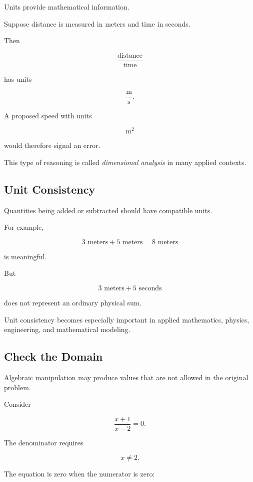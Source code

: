 Units provide mathematical information.

Suppose distance is measured in meters and time in seconds.

Then

\[ \frac{\text{distance}}{\text{time}} \]

has units

\[ \frac{\mathrm m}{\mathrm s}. \]

A proposed speed with units

\[ \mathrm m^2 \]

would therefore signal an error.

This type of reasoning is called \emph{dimensional analysis} in many applied
contexts.

\subsection{Unit Consistency}
\label{subsec:unit-consistency}

Quantities being added or subtracted should have compatible units.

For example,

\[ 3\text{ meters}+5\text{ meters}=8\text{ meters} \]

is meaningful.

But

\[ 3\text{ meters}+5\text{ seconds} \]

does not represent an ordinary physical sum.

Unit consistency becomes especially important in applied mathematics,
physics, engineering, and mathematical modeling.

\subsection{Check the Domain}
\label{subsec:check-domain}

Algebraic manipulation may produce values that are not allowed in the
original problem.

Consider

\[ \frac{x+1}{x-2}=0. \]

The denominator requires

\[ x\neq2. \]

The equation is zero when the numerator is zero:

